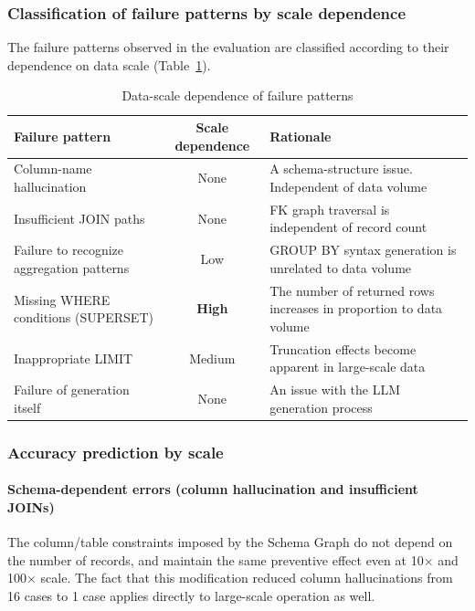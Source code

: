 \documentclass[5p,twocolumn]{elsarticle}
\begin{document}
\subsubsection{Classification of failure patterns by scale dependence}

The failure patterns observed in the evaluation are classified according to their dependence on data scale (Table~\ref{tab:scale_dependency}).

\begin{table}[h]
\centering
\caption{Data-scale dependence of failure patterns}
\label{tab:scale_dependency}
\begin{tabular}{p{3.8cm}cp{4.5cm}}
\hline
Failure pattern & Scale dependence & Rationale \\
\hline
Column-name hallucination & None & A schema-structure issue. Independent of data volume \\
Insufficient JOIN paths & None & FK graph traversal is independent of record count \\
Failure to recognize aggregation patterns & Low & GROUP BY syntax generation is unrelated to data volume \\
Missing WHERE conditions (SUPERSET) & \textbf{High} & The number of returned rows increases in proportion to data volume \\
Inappropriate LIMIT & Medium & Truncation effects become apparent in large-scale data \\
Failure of generation itself & None & An issue with the LLM generation process \\
\hline
\end{tabular}
\end{table}

\subsubsection{Accuracy prediction by scale}

\paragraph{Schema-dependent errors (column hallucination and insufficient JOINs)}
The column/table constraints imposed by the Schema Graph do not depend on the number of records,
and maintain the same preventive effect even at 10$\times$ and 100$\times$ scale.
The fact that this modification reduced column hallucinations from 16 cases to 1 case
applies directly to large-scale operation as well.
\end{document}
